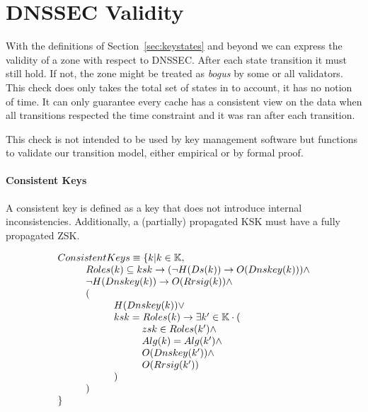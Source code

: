 \documentclass[twoside,english, a4paper]{article}
\begin{document}
\section{DNSSEC Validity} \label{validity}

With the definitions of Section~\ref{sec:keystates} and beyond we can
express the validity of a zone with respect to DNSSEC. After each state
transition it must still hold. If not, the zone might be treated as
\emph{bogus} by some or all validators. This check does only takes the 
total set of states in to account, it has no notion of time. It can
only guarantee every cache has a consistent view on the data when all
transitions respected the time constraint and it was ran after each
transition.

This check is not intended to be used by key management software but
functions to validate our transition model, either empirical or by 
formal proof.

\paragraph{Consistent Keys}
A consistent key is defined as a key that does not introduce 
internal inconsistencies. Additionally, a (partially) propagated KSK must have a fully
propagated ZSK.

\begin{equation}
\begin{array}{l}
ConsistentKeys \equiv \{ k | k\in\mathbb{K}, \\
\hskip 1cm	Roles(k) \subseteq {ksk} \rightarrow (\neg H(Ds(k)) \rightarrow O(Dnskey(k))) \wedge \\
\hskip 1cm	\neg H(Dnskey(k)) \rightarrow O(Rrsig(k)) \wedge \\
\hskip 1cm	( \\
\hskip 2cm		H(Dnskey(k)) \vee \\
\hskip 2cm		ksk=Roles(k) \rightarrow \exists k' \in \mathbb{K} \cdot (\\
\hskip 3cm			zsk \in Roles(k') \wedge \\
\hskip 3cm			Alg(k)=Alg(k') \wedge \\
\hskip 3cm			O(Dnskey(k')) \wedge \\
\hskip 3cm			O(Rrsig(k'))\\
\hskip 2cm		)\\
\hskip 1cm	)\\
\}
\end{array}
\end{equation}
\end{document}
